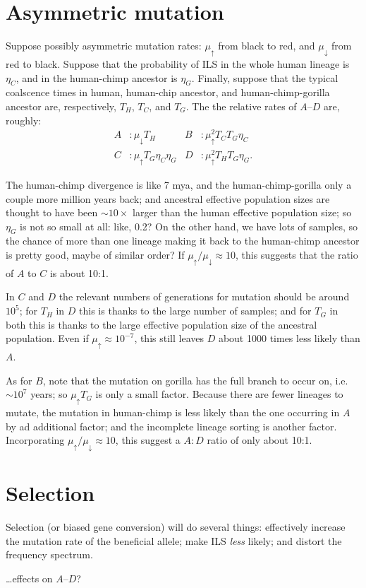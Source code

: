 \documentclass{article}
\newcommand{\mudn}{\mu_\downarrow}
\newcommand{\muup}{\mu_\uparrow}
\begin{document}
\section{Asymmetric mutation}

Suppose possibly asymmetric mutation rates: $\muup$ from black to red,
and $\mudn$ from red to black.
Suppose that the probability of ILS in the whole human lineage is $\eta_C$,
and in the human-chimp ancestor is $\eta_G$.
Finally, suppose that the typical coalscence times in human, human-chip ancestor, and human-chimp-gorilla ancestor are, respectively, $T_H$, $T_C$, and $T_G$.
The the relative rates of $A$--$D$ are, roughly:
\begin{align}
A&: \mudn T_H & B&: \muup^2 T_C T_G \eta_C \\
C&: \muup T_G \eta_C \eta_G & D&: \muup^2 T_H T_G \eta_G  .
\end{align}

The human-chimp divergence is like 7 mya, 
and the human-chimp-gorilla only a couple more million years back;
and ancestral effective population sizes are thought to have been $\sim 10 \times$ larger than the human effective population size; so $\eta_G$ is not so small at all: 
like, 0.2?
On the other hand, we have lots of samples, so the chance of more than one lineage making it back to the human-chimp ancestor is pretty good, maybe of similar order?
If $\muup/\mudn \approx 10$, this suggests that the ratio of $A$ to $C$ is about 10:1.

In $C$ and $D$ the relevant numbers of generations for mutation should be around $10^5$; for $T_H$ in $D$ this is thanks to the large number of samples; 
and for $T_G$ in both this is thanks to the large effective population size of the ancestral population.  
Even if $\muup \approx 10^{-7}$, this still leaves $D$ about 1000 times less likely than $A$.

As for $B$, note that the mutation on gorilla has the full branch to occur on, i.e.~$\sim10^7$ years; so $\muup T_G$ is only a small factor.
Because there are fewer lineages to mutate, the mutation in human-chimp is less likely than the one occurring in $A$ by ad additional factor; and the incomplete lineage sorting is another factor. 
Incorporating $\muup/\mudn\approx10$, this suggest a $A:D$ ratio of only about 10:1.

\section{Selection}

Selection (or biased gene conversion) will do several things:
effectively increase the mutation rate of the beneficial allele;
make ILS \emph{less} likely;
and distort the frequency spectrum.

\ldots effects on $A$--$D$?
\end{document}

